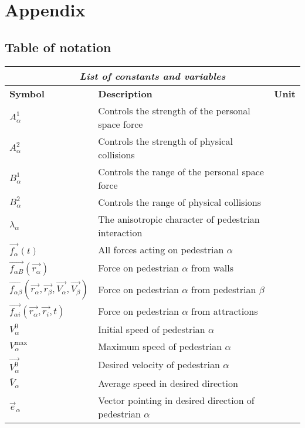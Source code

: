 \section{Appendix}

\subsection{Table of notation}
\begin{center}
\begin{tabular}{lll}
\hline
\multicolumn{3}{|c|}{\emph{List of constants and variables}}\\
\hline
\small{\textbf{Symbol}} & \small{\textbf{Description}} & \small{\textbf{Unit}}\\
\hline
$A_{\alpha}^{1}$ & \small{Controls the strength of the personal space force}\\
\hline
$A_{\alpha}^{2}$ & \small{Controls the strength of physical collisions}  & \\
\hline
$B_{\alpha}^{1}$ & \small{Controls the range of the personal space force} & \\
\hline
$B_{\alpha}^{2}$ & \small{Controls the range of physical collisions} & \\
\hline
$\lambda_{\alpha}$ & The anisotropic character of pedestrian interaction & \\
\hline
$\vec{f_{\alpha}} \left( t \right)$ & All forces acting on pedestrian $\alpha$  & \\
\hline
$\vec{f_{\alpha B}} \left( \vec{r_{\alpha}} \right)$ & Force on pedestrian $\alpha$ from walls & \\
\hline
$\vec{f_{\alpha \beta}} \left( \vec{r_{\alpha}}, \vec{r_{\beta}}, \vec{V_{\alpha}}, \vec{V_{\beta}} \right)$ & Force on pedestrian $\alpha$ from pedestrian $\beta$ & \\
\hline
$\vec{f_{\alpha i}} \left( \vec{r_{\alpha}}, \vec{r_{i}}, t \right)$ & Force on pedestrian $\alpha$ from attractions & \\
\hline
$V_{\alpha}^{0}$ & Initial speed of pedestrian $\alpha$ & \\
\hline
$V_{\alpha}^{\text{max}}$ & Maximum speed of pedestrian $\alpha$ & \\
\hline
$\vec{V_{\alpha}^{\text{0}}}$ & Desired velocity of pedestrian $\alpha$ & \\
\hline
$\overline{V}_{\alpha}$ & Average speed in desired direction & \\
\hline
$\vec{e}_{\alpha}$ & Vector pointing in desired direction of pedestrian $\alpha$ & \\

\end{tabular}
\end{center}
